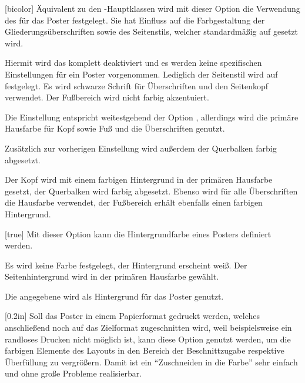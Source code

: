 \begin{Bundle*}[v2.05]{}
\begin{Declaration}{}[bicolor]
\printdeclarationlist%
%
Äquivalent zu den \TUDScript-Hauptklassen wird mit dieser Option die Verwendung 
des \TUDCDs für das Poster festgelegt. Sie hat Einfluss auf die Farbgestaltung 
der Gliederungsüberschriften sowie des Seitenstils, welcher standardmäßig auf 
 gesetzt wird.
%
\begin{values}{}
\itemfalse
  Hiermit wird das \CD komplett deaktiviert und es werden keine spezifischen 
  Einstellungen für ein Poster vorgenommen. Lediglich der Seitenstil wird auf 
   festgelegt.
  Es wird schwarze Schrift für Überschriften und den Seitenkopf verwendet. Der 
  Fußbereich wird nicht farbig akzentuiert.
\item[lightcolor/pale]
  Die Einstellung entspricht weitestgehend der Option , 
  allerdings wird die primäre Hausfarbe  für Kopf sowie Fuß und 
  die Überschriften genutzt.
\item[barcolor]
  Zusätzlich zur vorherigen Einstellung wird außerdem der Querbalken farbig 
  abgesetzt.
\item[bicolor/color/fullcolor]
  Der Kopf wird mit einem farbigen Hintergrund in der primären Hausfarbe 
   gesetzt, der Querbalken wird farbig abgesetzt. Ebenso wird für 
  alle Überschriften die Hausfarbe verwendet, der Fußbereich erhält ebenfalls 
  einen farbigen Hintergrund.
\end{values}
\end{Declaration}

\begin{Declaration}{}[true]
\printdeclarationlist%
%
Mit dieser Option kann die Hintergrundfarbe eines Posters definiert werden.
%
\begin{values}{}
\itemfalse*[nocolor]
  Es wird keine Farbe festgelegt, der Hintergrund erscheint weiß.
\itemtrue*[color]
  Der Seitenhintergrund wird in der primären Hausfarbe  gewählt.
\item[\PValueName{Farbe}]
  Die angegebene  wird als Hintergrund für das Poster genutzt.
\end{values}
\end{Declaration}

\begin{Declaration}{}[0.2in]
\printdeclarationlist%
%
%
%
Soll das Poster in einem Papierformat gedruckt werden, welches anschließend 
noch auf das Zielformat zugeschnitten wird, weil beispielsweise ein randloses 
Drucken nicht möglich ist, kann diese Option genutzt werden, um die farbigen 
Elemente des Layouts in den Bereich der Beschnittzugabe respektive Überfüllung 
zu vergrößern. Damit ist ein \enquote{Zuschneiden in die Farbe} sehr einfach 
und ohne große Probleme realisierbar.


\end{Declaration}
\end{Bundle*}
